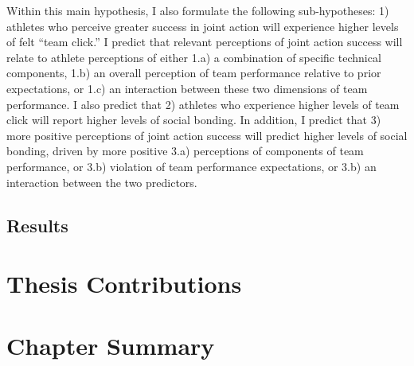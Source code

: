 Within this main hypothesis, I also formulate the following sub-hypotheses: 1) athletes who perceive greater success in joint action will experience higher levels of felt  ``team click.'' I predict that relevant perceptions of joint action success will relate to athlete perceptions of either 1.a) a combination of specific technical components, 1.b) an overall perception of team performance relative to prior expectations, or 1.c) an interaction between these two dimensions of team performance.  I also predict that 2) athletes who experience higher levels of team click will report higher levels of social bonding. In addition, I predict that 3) more positive perceptions of joint action success will predict higher levels of social bonding, driven by more positive 3.a) perceptions of components of team performance, or 3.b) violation of team performance expectations, or 3.b) an interaction between the two predictors.



\subsection{Results}

\section{Thesis Contributions}

\section{Chapter Summary}
